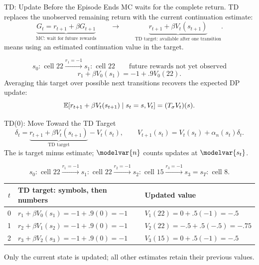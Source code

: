 \begin{frame}{TD: Update Before the Episode Ends}
\small
MC waits for the complete return. TD replaces the unobserved remaining return with the current continuation estimate:
\[
\underbrace{G_t=r_{t+1}+\beta G_{t+1}}_{\text{MC: wait for future rewards}}
\qquad\longrightarrow\qquad
\underbrace{r_{t+1}+\beta V_t(s_{t+1})}_{\text{TD target: available after one transition}}.
\]
 means using an estimated continuation value in the target.
\par\medskip
{}
\[s_0:\text{ cell 22}\xrightarrow{r_1=-1}s_1:\text{ cell 22}\qquad\text{future rewards not yet observed}\]
\[r_1+\beta V_0(s_1)=-1+.9V_0(22).\]
Averaging this target over possible next transitions recovers the expected DP update:
\[\mathbb E[r_{t+1}+\beta V_t(s_{t+1})\mid s_t=s,V_t]=(T_\sigma V_t)(s).\]
\end{frame}

\begin{frame}{TD(0): Move Toward the TD Target}
\small
\[\delta_t=\underbrace{r_{t+1}+\beta V_t(s_{t+1})}_{\text{TD target}}-V_t(s_t),\qquad
V_{t+1}(s_t)=V_t(s_t)+\alpha_n(s_t)\delta_t.\]
The  is target minus estimate; \(\modelvar{n}\) counts updates at \(\modelvar{s_t}\).
\par\smallskip
{}
\[s_0:\text{ cell 22}\xrightarrow{r_1=-1}s_1:\text{ cell 22}
\xrightarrow{r_2=-1}s_2:\text{ cell 15}\xrightarrow{r_3=-1}s_3=s_T:\text{ cell 8}.\]
\begin{center}\renewcommand{\arraystretch}{1.2}\begin{tabular}{cll}\toprule
\(t\) & TD target: symbols, then numbers & Updated value\\\midrule
0 & \(r_1+\beta V_0(s_1)=-1+.9(0)=-1\) & \(V_1(22)=0+.5(-1)=-.5\)\\
1 & \(r_2+\beta V_1(s_2)=-1+.9(0)=-1\) & \(V_2(22)=-.5+.5(-.5)=-.75\)\\
2 & \(r_3+\beta V_2(s_3)=-1+.9(0)=-1\) & \(V_3(15)=0+.5(-1)=-.5\)\\\bottomrule
\end{tabular}\end{center}
Only the current state is updated; all other estimates retain their previous values.
\end{frame}

